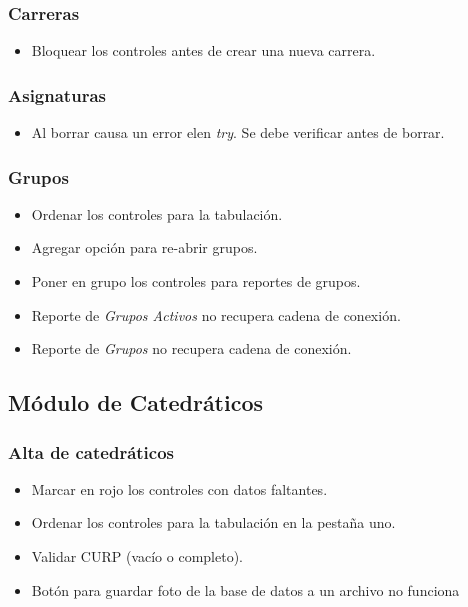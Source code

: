 \documentclass[12pt,spanish,twocolumn]{article}
\begin{document}
\subsubsection{Carreras}
\begin{itemize}
\item Bloquear los controles antes de crear una nueva carrera.
\end{itemize}

\subsubsection{Asignaturas}
\begin{itemize}
\item Al borrar causa un error elen \emph{try}. Se debe verificar antes de borrar.
\end{itemize}

\subsubsection{Grupos}
\begin{itemize}
\item Ordenar los controles para la tabulaci\'on.
\item Agregar opci\'on para re-abrir grupos.
\item Poner en grupo los controles para reportes de grupos.
\item Reporte de \emph{Grupos Activos} no recupera cadena de conexi\'on.
\item Reporte de \emph{Grupos} no recupera cadena de conexi\'on.
\end{itemize}

\subsection{M\'odulo de Catedr\'aticos}

\subsubsection{Alta de catedr\'aticos}
\begin{itemize}
\item Marcar en rojo los controles con datos faltantes.
\item Ordenar los controles para la tabulaci\'on en la pesta\~na uno.
\item Validar CURP (vac\'io o completo).
\item Bot\'on para guardar foto de la base de datos a un archivo no funciona
\end{itemize}
\end{document}
